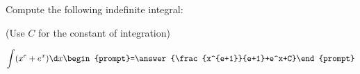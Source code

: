 \documentclass{ximera}
\author{Jim Talamo}
\begin{document}
\begin{exercise}
Compute the following indefinite integral:

\begin{prompt} (Use $C$ for the constant of integration) \end{prompt}

\[
\int (x^{e}+e^x) \d x 
\begin{prompt}=\answer{\frac{x^{e+1}}{e+1}+e^x+C}\end{prompt}
\]

\end{exercise}
\end{document}

